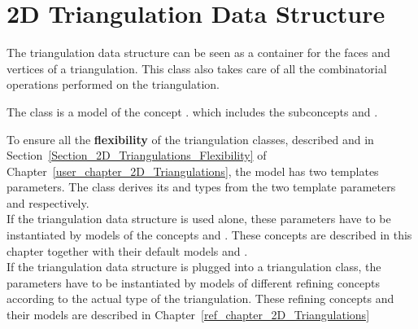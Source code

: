 

\chapter{2D Triangulation Data Structure}
\label{ref_chapter_2D_Triangulation_Data_Structure}

The triangulation data structure can be seen as a container
for the faces and vertices of a triangulation. This class also takes care
of all the combinatorial operations performed on  the triangulation.

The class 
is  a model of the concept .
which includes the subconcepts
and .

To ensure all the \textbf{flexibility} of  the triangulation
classes, 
described 
and in Section~\ref{Section_2D_Triangulations_Flexibility}
of
Chapter~\ref{user_chapter_2D_Triangulations}, the  model 
has two templates parameters.
The class 
derives its  and  types 
from the two template parameters  and  respectively. \\
If the triangulation data structure
is used alone, these parameters 
have to be instantiated by models
of the concepts  and 
. These concepts
are described in this chapter together with their
default models 
and  . \\
If the triangulation data structure
is plugged into a triangulation class, the parameters
have to be instantiated by models of different 
refining concepts according to the actual type of the triangulation.
These refining concepts and their models
are described in Chapter~\ref{ref_chapter_2D_Triangulations}

